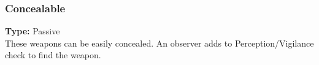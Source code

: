 \subsubsection{Concealable}
\label{iqty:concealable}
\textbf{Type:} Passive\\
These weapons can be easily concealed. An
observer adds \setback to Perception/Vigilance
check to find the weapon.
